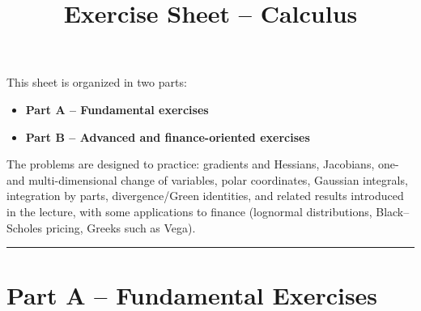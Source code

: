 \documentclass[11pt]{article}
\title{Exercise Sheet -- Calculus}
\author{}
\date{}
\begin{document}
\maketitle

This sheet is organized in two parts:
\begin{itemize}
  \item \textbf{Part A -- Fundamental exercises}
  \item \textbf{Part B -- Advanced and finance-oriented exercises}
\end{itemize}

The problems are designed to practice: gradients and Hessians, Jacobians, one- and multi-dimensional change of variables, polar coordinates, Gaussian integrals, integration by parts, divergence/Green identities, and related results introduced in the lecture, with some applications to finance (lognormal distributions, Black--Scholes pricing, Greeks such as Vega).

\bigskip
\hrule
\bigskip

\section*{Part A -- Fundamental Exercises}
\end{document}
